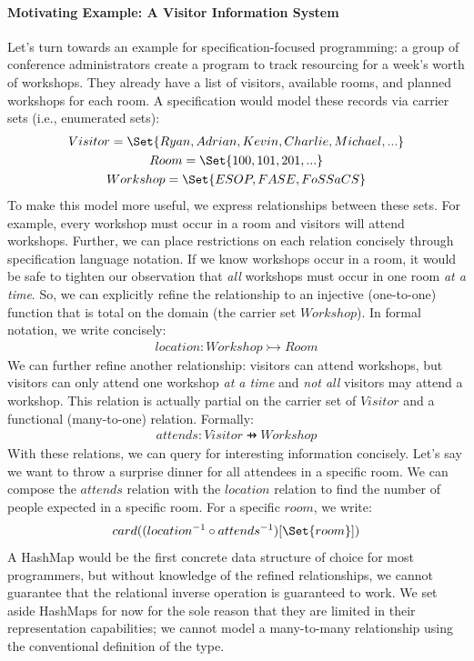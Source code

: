 \paragraph{Motivating Example: A Visitor Information System}
Let's turn towards an example for specification-focused programming: a group of conference administrators create a program to track resourcing for a week's worth of workshops. They already have a list of visitors, available rooms, and planned workshops for each room. A specification would model these records via carrier sets (i.e., enumerated sets):
\begin{gather*}
    Visitor = \Set{Ryan, Adrian, Kevin, Charlie, Michael, ...}\\
    Room = \Set{100, 101, 201, ...}\\
    Workshop = \Set{ESOP, FASE, FoSSaCS}
\end{gather*}
To make this model more useful, we express relationships between these sets. For example, every workshop must occur in a room and visitors will attend workshops. Further, we can place restrictions on each relation concisely through specification language notation. If we know workshops occur in a room, it would be safe to tighten our observation that \textit{all} workshops must occur in one room \textit{at a time}. So, we can explicitly refine the relationship to an injective (one-to-one) function that is total on the domain (the carrier set $Workshop$). In formal notation, we write concisely:
\begin{gather*}
    location: Workshop \tinj Room
\end{gather*}
We can further refine another relationship: visitors can attend workshops, but visitors can only attend one workshop \textit{at a time} and \textit{not all} visitors may attend a workshop. This relation is actually partial on the carrier set of $Visitor$ and a functional (many-to-one) relation. Formally:
\begin{gather*}
    attends: Visitor \pfun Workshop
\end{gather*}
With these relations, we can query for interesting information concisely. Let's say we want to throw a surprise dinner for all attendees in a specific room. We can compose the $attends$ relation with the $location$ relation to find the number of people expected in a specific room. For a specific $room$, we write:
\begin{gather*}
    card((location^{-1} \circ attends^{-1})[\Set{room}])
\end{gather*}
A HashMap would be the first concrete data structure of choice for most programmers, but without knowledge of the refined relationships, we cannot guarantee that the relational inverse operation is guaranteed to work. We set aside HashMaps for now for the sole reason that they are limited in their representation capabilities; we cannot model a many-to-many relationship using the conventional definition of the type.

